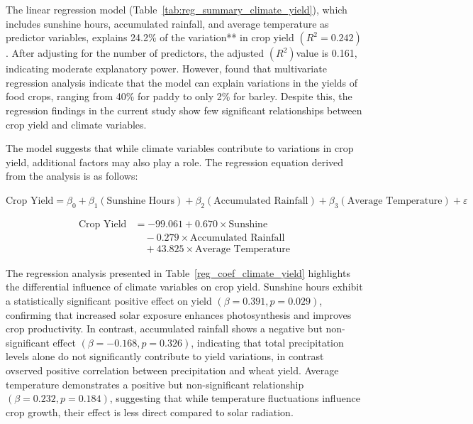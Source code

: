 The linear regression model (Table~\ref{tab:reg_summary_climate_yield}), which includes sunshine hours, accumulated rainfall, and average temperature as predictor variables, explains 24.2\% of the variation** in crop yield $(R^2 = 0.242)$. After adjusting for the number of predictors, the adjusted $(R^2) $value is 0.161, indicating moderate explanatory power. However, \parencite{maharjanEffectClimateVariables2013} found that multivariate regression analysis indicate that the model can explain variations in the yields of food crops, ranging from 40\% for paddy to only 2\% for barley. Despite this, the regression findings in the current study show few significant relationships between crop yield and climate variables.

The model suggests that while climate variables contribute to variations in crop yield, additional factors may also play a role. The regression equation derived from the analysis is as follows:  

$
\text{Crop Yield} = \beta_0 + \beta_1 (\text{Sunshine Hours}) + \beta_2 (\text{Accumulated Rainfall}) + \beta_3 (\text{Average Temperature}) + \varepsilon
$

\begin{equation}
    \begin{split}
        \text{Crop Yield} &= -99.061 + 0.670 \times \text{Sunshine} \\
        &\quad - 0.279 \times \text{Accumulated Rainfall} \\
        &\quad + 43.825 \times \text{Average Temperature}
    \end{split}
\end{equation}

The regression analysis presented in Table~\ref{reg_coef_climate_yield} highlights the differential influence of climate variables on crop yield. Sunshine hours exhibit a statistically significant positive effect on yield $(\beta = 0.391, p = 0.029)$, confirming that increased solar exposure enhances photosynthesis and improves crop productivity. In contrast, accumulated rainfall shows a negative but non-significant effect $(\beta = -0.168, p = 0.326)$, indicating that total precipitation levels alone do not significantly contribute to yield variations, in contrast \parencite{thapa-parajuliImpactClimateChange2016} ovserved positive correlation between precipitation and wheat yield. Average temperature demonstrates a positive but non-significant relationship $(\beta = 0.232, p = 0.184)$, suggesting that while temperature fluctuations influence crop growth, their effect is less direct compared to solar radiation.

